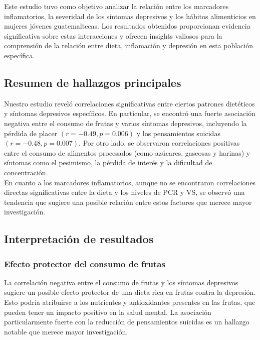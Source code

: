 \documentclass[jou]{apa7}
\begin{document}
	Este estudio tuvo como objetivo analizar la relación entre los
	marcadores inflamatorios, la severidad de los síntomas depresivos y los
	hábitos alimenticios en mujeres jóvenes guatemaltecas. Los resultados
	obtenidos proporcionan evidencia significativa sobre estas interacciones
	y ofrecen insights valiosos para la comprensión de la relación entre
	dieta, inflamación y depresión en esta población específica.

	\subsection{Resumen de hallazgos principales}\label{resumen-de-hallazgos-principales}

	Nuestro estudio reveló correlaciones significativas entre ciertos
	patrones dietéticos y síntomas depresivos específicos. En particular, se
	encontró una fuerte asociación negativa entre el consumo de frutas y
	varios síntomas depresivos, incluyendo la pérdida de placer $(r = -0.49,
	p = 0.006)$ y los pensamientos suicidas $(r = -0.48, p = 0.007)$. Por otro
	lado, se observaron correlaciones positivas entre el consumo de
	alimentos procesados (como azúcares, gaseosas y harinas) y síntomas como
	el pesimismo, la pérdida de interés y la dificultad de concentración.\\

	En cuanto a los marcadores inflamatorios, aunque no se encontraron
	correlaciones directas significativas entre la dieta y los niveles de
	PCR y VS, se observó una tendencia que sugiere una posible relación
	entre estos factores que merece mayor investigación.


	\subsection{Interpretación de resultados}\label{interpretaciuxf3n-de-resultados}

	\subsubsection{Efecto protector del consumo de frutas}

	La correlación negativa entre el consumo de frutas y los síntomas
	depresivos sugiere un posible efecto protector de una dieta rica en
	frutas contra la depresión. Esto podría atribuirse a los nutrientes y
	antioxidantes presentes en las frutas, que pueden tener un impacto
	positivo en la salud mental. La asociación particularmente fuerte con la
	reducción de pensamientos suicidas es un hallazgo notable que merece
	mayor investigación.\\
\end{document}
